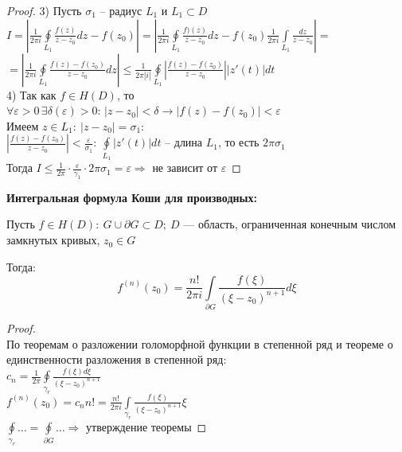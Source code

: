\begin{proof}
    3) Пусть $\sigma_1$ -- радиус $L_1$ и $L_1 \subset D$\\
    $I = \left| \frac{1}{2\pi i } \oint\limits_{L_1} \frac{f(z)}{z-z_0}dz-f(z_0) \right| = \left| \frac{1}{2\pi i} \oint\limits_{L_1} \frac{f)(z)}{z-z_0}dz - f(z_0)\frac{1}{2\pi i}\int\limits_{L_1} \frac{dz}{z-z_0}\right| = $\\
    $= \left| \frac{1}{2\pi i}\oint\limits_{L_1} \frac{f(z)-f(z_0)}{z-z_0}dz \right| \leq \frac{1}{2\pi |i|} \oint\limits_{L_1}\left| \frac{f(z)-f(z_0)}{z-z_0} \right||z'(t)|dt$\\

    4) Так как $f \in H(D)$, то $\forall \varepsilon > 0 \, \exists \delta (\varepsilon)>0: \, |z-z_0|<\delta \rightarrow |f(z)-f(z_0)|<\varepsilon$\\
    Имеем $z\in L_1: \ |z-z_0| = \sigma_1$:\\
    $\left| \frac{f(z)-f(z_0)}{z-z_0} \right|< \frac{\varepsilon}{\sigma_1}: \ \oint\limits_{L_1}|z'(t)|dt$ -- длина $L_1$, то есть $2\pi \sigma_1$\\
    Тогда $I \leq \frac{1}{2\pi}\cdot \frac{\varepsilon}{\gamma_1}\cdot 2\pi \sigma_1 = \varepsilon \Rightarrow$ не зависит от $\varepsilon$ 

\end{proof}
\textbf{Интегральная формула Коши для производных:}

Пусть $f\in H(D): \ G\cup \partial G \subset D; \ D$ --- область, ограниченная конечным числом замкнутых кривых, $z_0 \in G$

Тогда:
$$f^{(n)}(z_0) = \frac{n!}{2\pi i} \int\limits_{\partial G}\frac{f(\xi)}{(\xi-z_0)^{n+1}}d\xi$$

\begin{proof}
    \ \\
    По теоремам о разложении голоморфной функции в степенной ряд и теореме о единственности разложения в степенной ряд:\\
    $c_n=\frac{1}{2\pi} \oint\limits_{{\gamma}_r} \frac{f(\xi)d\xi}{(\xi-z_0)^{n+1}}$ \\[2mm]
    $f^{(n)}(z_0) = c_n n! = \frac{n!}{2 \pi i}\int \limits_{{\gamma}_r} \frac{f(\xi)}{(\xi - z_0)^{n+1}}\xi$ \\[2mm]
    $\oint\limits_{{\gamma}_r}\dots=\oint\limits_{\partial G}\dots \Rightarrow$ утверждение теоремы
\end{proof}
